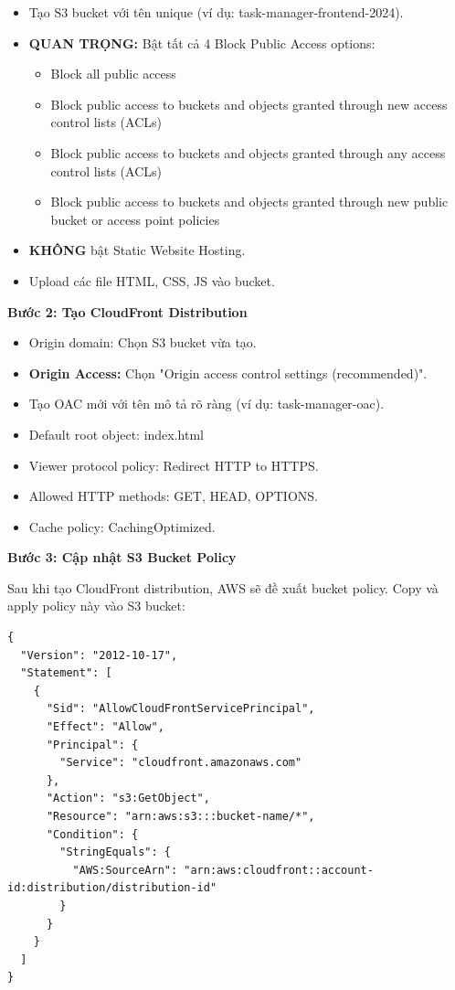 \begin{itemize}
    \item Tạo S3 bucket với tên unique (ví dụ: task-manager-frontend-2024).
    \item \textbf{QUAN TRỌNG:} Bật tất cả 4 Block Public Access options:
    \begin{itemize}
        \item Block all public access
        \item Block public access to buckets and objects granted through new access control lists (ACLs)
        \item Block public access to buckets and objects granted through any access control lists (ACLs)
        \item Block public access to buckets and objects granted through new public bucket or access point policies
    \end{itemize}
    \item \textbf{KHÔNG} bật Static Website Hosting.
    \item Upload các file HTML, CSS, JS vào bucket.
\end{itemize}

\textbf{Bước 2: Tạo CloudFront Distribution}

\begin{itemize}
    \item Origin domain: Chọn S3 bucket vừa tạo.
    \item \textbf{Origin Access:} Chọn "Origin access control settings (recommended)".
    \item Tạo OAC mới với tên mô tả rõ ràng (ví dụ: task-manager-oac).
    \item Default root object: index.html
    \item Viewer protocol policy: Redirect HTTP to HTTPS.
    \item Allowed HTTP methods: GET, HEAD, OPTIONS.
    \item Cache policy: CachingOptimized.
\end{itemize}

\textbf{Bước 3: Cập nhật S3 Bucket Policy}

Sau khi tạo CloudFront distribution, AWS sẽ đề xuất bucket policy. Copy và apply policy này vào S3 bucket:

\begin{verbatim}
{
  "Version": "2012-10-17",
  "Statement": [
    {
      "Sid": "AllowCloudFrontServicePrincipal",
      "Effect": "Allow",
      "Principal": {
        "Service": "cloudfront.amazonaws.com"
      },
      "Action": "s3:GetObject",
      "Resource": "arn:aws:s3:::bucket-name/*",
      "Condition": {
        "StringEquals": {
          "AWS:SourceArn": "arn:aws:cloudfront::account-id:distribution/distribution-id"
        }
      }
    }
  ]
}
\end{verbatim}

